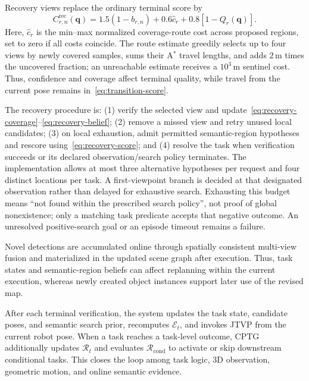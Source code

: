 \documentclass[letterpaper,10pt,journal]{IEEEtran}
\begin{document}
Recovery views replace the ordinary terminal score by
\begin{equation}
C_{r,n}^{\mathrm{rec}}(\mathbf q)=
1.5(1-b_{r,n})+0.6\widehat c_r+0.8[1-Q_r(\mathbf q)].
\label{eq:recovery-score}
\end{equation}
Here, $\widehat c_r$ is the min--max normalized coverage-route cost across proposed regions, set to zero if all costs coincide. The route estimate greedily selects up to four views by newly covered samples, sums their A$^*$ travel lengths, and adds $2\,\mathrm m$ times the uncovered fraction; an unreachable estimate receives a $10^3\,\mathrm m$ sentinel cost. Thus, confidence and coverage affect terminal quality, while travel from the current pose remains in~\eqref{eq:transition-score}.

The recovery procedure is: (1) verify the selected view and update~\eqref{eq:recovery-coverage}--\eqref{eq:recovery-belief}; (2) remove a missed view and retry unused local candidates; (3) on local exhaustion, admit permitted semantic-region hypotheses and rescore using~\eqref{eq:recovery-score}; and (4) resolve the task when verification succeeds or its declared observation/search policy terminates. The implementation allows at most three alternative hypotheses per request and four distinct locations per task. A first-viewpoint branch is decided at that designated observation rather than delayed for exhaustive search. Exhausting this budget means ``not found within the prescribed search policy'', not proof of global nonexistence; only a matching task predicate accepts that negative outcome. An unresolved positive-search goal or an episode timeout remains a failure.

Novel detections are accumulated online through spatially consistent multi-view fusion and materialized in the updated scene graph after execution. Thus, task states and semantic-region beliefs can affect replanning within the current execution, whereas newly created object instances support later use of the revised map.

After each terminal verification, the system updates the task state, candidate poses, and semantic search prior, recomputes $\mathcal E_t$, and invokes JTVP from the current robot pose. When a task reaches a task-level outcome, CPTG additionally updates $\mathcal R_t$ and evaluates $\mathcal R_{\mathrm{cond}}$ to activate or skip downstream conditional tasks. This closes the loop among task logic, 3D observation, geometric motion, and online semantic evidence.
\end{document}
